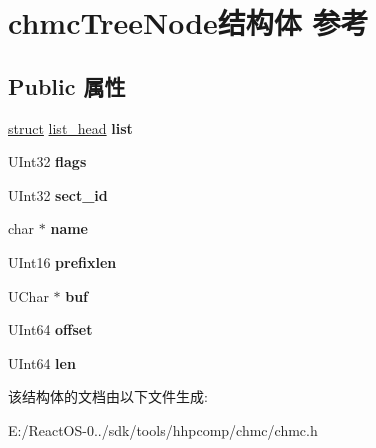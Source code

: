 \hypertarget{structchmc_tree_node}{}\section{chmc\+Tree\+Node结构体 参考}
\label{structchmc_tree_node}
\subsection*{Public 属性}
\begin{DoxyCompactItemize}
\item 
\mbox{\label{structchmc_tree_node_ac5fd9330162396824c9af1986ce7fd11}} 
\hyperlink{interfacestruct}{struct} \hyperlink{structlist__head}{list\+\_\+head} {\bfseries list}
\item 
\mbox{\label{structchmc_tree_node_a0cdb844b754c55a5afde51cf7f9d6ff5}} 
U\+Int32 {\bfseries flags}
\item 
\mbox{\label{structchmc_tree_node_a1c3ddb1178e79ce22c8a96916b586576}} 
U\+Int32 {\bfseries sect\+\_\+id}
\item 
\mbox{\label{structchmc_tree_node_a96467c8e97cfbbf68d99a1de2a57cb3b}} 
char $\ast$ {\bfseries name}
\item 
\mbox{\label{structchmc_tree_node_add4cece5aca5592decf820340ab4fdeb}} 
U\+Int16 {\bfseries prefixlen}
\item 
\mbox{\label{structchmc_tree_node_a34c005bb17e85a0f8bb1a0bc0be20d7e}} 
U\+Char $\ast$ {\bfseries buf}
\item 
\mbox{\label{structchmc_tree_node_ae5d41a3c8d4346b3f2a282c2dbca3ab2}} 
U\+Int64 {\bfseries offset}
\item 
\mbox{\label{structchmc_tree_node_a3741717abf6144d022515a74a597fe4b}} 
U\+Int64 {\bfseries len}
\end{DoxyCompactItemize}


该结构体的文档由以下文件生成\+:\begin{DoxyCompactItemize}
\item 
E\+:/\+React\+O\+S-\/0../sdk/tools/hhpcomp/chmc/chmc.\+h\end{DoxyCompactItemize}
